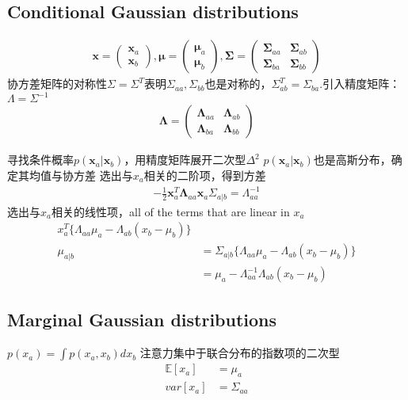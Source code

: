 \documentclass[a4paper]{article}
\begin{document}
\subsection{Conditional Gaussian distributions}
\begin{align*}
  \boldsymbol{x} =
    \begin{pmatrix} \boldsymbol{x}_a\\ \boldsymbol{x}_b \end{pmatrix},
  \boldsymbol{\mu} =
    \begin{pmatrix} \boldsymbol{\mu}_a\\ \boldsymbol{\mu}_b \end{pmatrix},
  \boldsymbol{\Sigma} =
    \begin{pmatrix}
      \boldsymbol{\Sigma}_{aa} & \boldsymbol{\Sigma}_{ab}\\
      \boldsymbol{\Sigma}_{ba} & \boldsymbol{\Sigma}_{bb}
    \end{pmatrix}
\end{align*}
协方差矩阵的对称性$\Sigma = \Sigma^T$表明$\Sigma_{aa}, \Sigma_{bb}$也是对称的，$\Sigma_{ab}^T=\Sigma_{ba}$.引入精度矩阵：$\Lambda = \Sigma^{-1}$
\begin{align*}
  \boldsymbol{\Lambda} =
    \begin{pmatrix}
      \boldsymbol{\Lambda}_{aa} & \boldsymbol{\Lambda}_{ab}\\
      \boldsymbol{\Lambda}_{ba} & \boldsymbol{\Lambda}_{bb}
    \end{pmatrix}
\end{align*}

寻找条件概率$p(\boldsymbol{x}_a|\boldsymbol{x}_b)$，用精度矩阵展开二次型$\Delta^2$
$p(\boldsymbol{x}_a|\boldsymbol{x}_b)$也是高斯分布，确定其均值与协方差
选出与$x_a$相关的二阶项，得到方差
\begin{align*}
  -\frac{1}{2} \boldsymbol{x}_a^T \boldsymbol{\Lambda}_{aa} \boldsymbol{x}_a
  \Sigma_{a|b} = \Lambda_{aa}^{-1}
\end{align*}
选出与$x_a$相关的线性项，all of the terms that are linear in $x_a$
\begin{align*}
  x_a^T\{ \Lambda_{aa}\mu_a - \Lambda_{ab}(x_b-\mu_b) \}\\
  \mu_{a|b} &= \Sigma_{a|b} \{ \Lambda_{aa}\mu_a - \Lambda_{ab}(x_b-\mu_b) \}\\
         &=  \mu_a - \Lambda_{aa}^{-1}\Lambda_{ab}(x_b - \mu_b)
\end{align*}

\subsection{Marginal Gaussian distributions}
$p(x_a) = \int p(x_a,x_b) dx_b$
注意力集中于联合分布的指数项的二次型
\begin{align*}
  \mathbb{E}[x_a] &= \mu_a\\
  var[x_a] &= \Sigma_{aa}
\end{align*}
\end{document}
